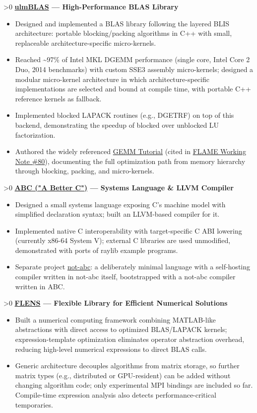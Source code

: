 \documentclass[10pt]{article}
\newcommand{\smallsize}{\fontsize{9.5pt}{11.6pt}\selectfont}  %
\newcommand{\looser}{\linespread{1.0417}\selectfont}
\newcommand{\cventry}[3][0]{%
  \par\vspace{4.5pt}%
  \ifnum#1>0 \needspace{#1\baselineskip}\fi
  {\bfseries #2}\hspace{0pt plus 1filll}{\smallsize #3}\par
  \nopagebreak\vspace{1pt}%
}
\newenvironment{cvitems}
  {\begin{itemize}[label=•, leftmargin=15pt, labelwidth=10pt, labelsep=0pt,
                   align=left, topsep=0pt, partopsep=0pt, parsep=0pt,
                   itemsep=1.5pt, beginpenalty=10000]\looser}
  {\end{itemize}\vspace{1.5pt}}
\begin{document}
\cventry{\href{https://github.com/michael-lehn/ulmBLAS}{ulmBLAS} — High-Performance BLAS Library}{C++ · Assembly}
\begin{cvitems}
  \item Designed and implemented a BLAS library following the layered BLIS architecture: portable blocking/packing algorithms in C++ with small, replaceable architecture-specific micro-kernels.
  \item Reached \textasciitilde97\% of Intel MKL DGEMM performance (single core, Intel Core 2 Duo, 2014 benchmarks) with custom SSE3 assembly micro-kernels; designed a modular micro-kernel architecture in which architecture-specific implementations are selected and bound at compile time, with portable C++ reference kernels as fallback.
  \item Implemented blocked LAPACK routines (e.g., DGETRF) on top of this backend, demonstrating the speedup of blocked over unblocked LU factorization.
  \item Authored the widely referenced \href{https://github.com/michael-lehn/gemm-tutorial}{GEMM Tutorial} (cited in \href{https://arxiv.org/abs/1609.00076}{FLAME Working Note \#80}), documenting the full optimization path from memory hierarchy through blocking, packing, and micro-kernels.
\end{cvitems}

\cventry[7]{\href{https://github.com/michael-lehn/abc-llvm}{ABC ("A Better C")} — Systems Language \& LLVM Compiler}{C++ · LLVM}
\begin{cvitems}
  \item Designed a small systems language exposing C's machine model with simplified declaration syntax; built an LLVM-based compiler for it.
  \item Implemented native C interoperability with target-specific C ABI lowering (currently x86-64 System V); external C libraries are used unmodified, demonstrated with ports of raylib example programs.
  \item Separate project \href{https://github.com/michael-lehn/not-abc}{not-abc}: a deliberately minimal language with a self-hosting compiler written in not-abc itself, bootstrapped with a not-abc compiler written in ABC.
\end{cvitems}

\cventry[8]{\href{https://github.com/michael-lehn/FLENS}{FLENS} — Flexible Library for Efficient Numerical Solutions}{C++}
\begin{cvitems}
  \item Built a numerical computing framework combining MATLAB-like abstractions with direct access to optimized BLAS/LAPACK kernels; expression-template optimization eliminates operator abstraction overhead, reducing high-level numerical expressions to direct BLAS calls.
  \item Generic architecture decouples algorithms from matrix storage, so further matrix types (e.g., distributed or GPU-resident) can be added without changing algorithm code; only experimental MPI bindings are included so far. Compile-time expression analysis also detects performance-critical temporaries.
\end{cvitems}
\end{document}
